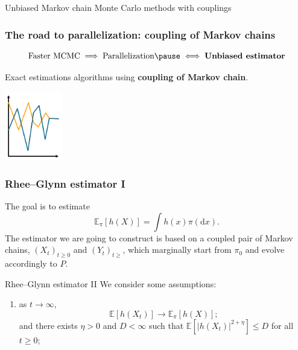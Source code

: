 \documentclass{beamer}
\begin{document}
\begin{section}{Unbiased Markov chain Monte Carlo methods with couplings}
	\begin{frame}[plain]{}
		\sectionpage
	\end{frame}

	\begin{frame}
	 	\frametitle{The road to parallelization: coupling of Markov chains}
	 	
	 	$$ \text{Faster MCMC} \implies \text{Parallelization} \pause \iff \text{\textbf{Unbiased estimator}}
	 	$$

		\pause
		\vspace{0.8 cm }
		\begin{minipage}{0.10\textwidth}

		\end{minipage}
		\hfill
		\begin{minipage}{0.45\textwidth}
			Exact estimations algorithms using \textbf{coupling of Markov chain}.
		\end{minipage}
		\hfill
		\begin{minipage}{0.40\textwidth}
			\begin{center}
				\includegraphics[height=3cm]{img/markov_coupled}
			\end{center}
		\end{minipage}
		
	\end{frame}

	\begin{frame}
	 	\frametitle{Rhee--Glynn estimator I}
	 	The goal is to estimate
	 	$$
	 	\mathbb{E}_{\pi}[h(X)] 
	 	= \int h(x) \pi (\text{d}x)
	 	.
	 	$$
	 	The estimator we are going to construct is based on a coupled pair of Markov chains, $(X_t)_{t\geq 0}$ and $(Y_t)_{t\geq}$, which marginally start from $\pi_0$ and evolve accordingly to $P$.\\ 
	\end{frame}
	
	\begin{frame}{Rhee--Glynn estimator II}
	 	We consider some assumptions:
	 	\begin{enumerate}
	 		\item as $t \to \infty$, 
	 		$$ \mathbb E [h(X_t)] \to \mathbb E_\pi [h(X)];$$
	 		and there exists $\eta > 0$ and $D < \infty$ such that $\mathbb E [|h(X_t)|^{2 + \eta}] \leq D$ for all $t \geq 0$; %
	 		

\end{enumerate}
\end{frame}
\end{section}
\end{document}
